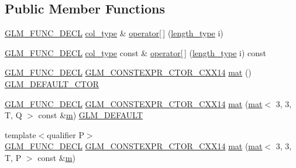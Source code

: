 \subsection*{Public Member Functions}
\begin{DoxyCompactItemize}
\item 
\mbox{\hyperlink{setup_8hpp_ab2d052de21a70539923e9bcbf6e83a51}{G\+L\+M\+\_\+\+F\+U\+N\+C\+\_\+\+D\+E\+CL}} \mbox{\hyperlink{structglm_1_1mat_3_013_00_013_00_01_t_00_01_q_01_4_a4d84bef3685131dbb0ac43cac0a3b147}{col\+\_\+type}} \& \mbox{\hyperlink{structglm_1_1mat_3_013_00_013_00_01_t_00_01_q_01_4_a2507891a0a3b6c233c4f8a58071a7d9e}{operator\mbox{[}$\,$\mbox{]}}} (\mbox{\hyperlink{structglm_1_1mat_3_013_00_013_00_01_t_00_01_q_01_4_ae1b8524f20936516a48384a2841b5b9d}{length\+\_\+type}} i)
\item 
\mbox{\hyperlink{setup_8hpp_ab2d052de21a70539923e9bcbf6e83a51}{G\+L\+M\+\_\+\+F\+U\+N\+C\+\_\+\+D\+E\+CL}} \mbox{\hyperlink{structglm_1_1mat_3_013_00_013_00_01_t_00_01_q_01_4_a4d84bef3685131dbb0ac43cac0a3b147}{col\+\_\+type}} const  \& \mbox{\hyperlink{structglm_1_1mat_3_013_00_013_00_01_t_00_01_q_01_4_abce9d671a13bf9f9a315b7f8b5042617}{operator\mbox{[}$\,$\mbox{]}}} (\mbox{\hyperlink{structglm_1_1mat_3_013_00_013_00_01_t_00_01_q_01_4_ae1b8524f20936516a48384a2841b5b9d}{length\+\_\+type}} i) const
\item 
\mbox{\hyperlink{setup_8hpp_ab2d052de21a70539923e9bcbf6e83a51}{G\+L\+M\+\_\+\+F\+U\+N\+C\+\_\+\+D\+E\+CL}} \mbox{\hyperlink{setup_8hpp_a0900f9145e68bf6061b6f5e7be3fa751}{G\+L\+M\+\_\+\+C\+O\+N\+S\+T\+E\+X\+P\+R\+\_\+\+C\+T\+O\+R\+\_\+\+C\+X\+X14}} \mbox{\hyperlink{structglm_1_1mat_3_013_00_013_00_01_t_00_01_q_01_4_ab10ee3449d1ee8d793fed6b94fe6270d}{mat}} () \mbox{\hyperlink{setup_8hpp_afb97a4e995bc004c0cbbfa22125b80ba}{G\+L\+M\+\_\+\+D\+E\+F\+A\+U\+L\+T\+\_\+\+C\+T\+OR}}
\item 
\mbox{\hyperlink{setup_8hpp_ab2d052de21a70539923e9bcbf6e83a51}{G\+L\+M\+\_\+\+F\+U\+N\+C\+\_\+\+D\+E\+CL}} \mbox{\hyperlink{setup_8hpp_a0900f9145e68bf6061b6f5e7be3fa751}{G\+L\+M\+\_\+\+C\+O\+N\+S\+T\+E\+X\+P\+R\+\_\+\+C\+T\+O\+R\+\_\+\+C\+X\+X14}} \mbox{\hyperlink{structglm_1_1mat_3_013_00_013_00_01_t_00_01_q_01_4_a15f1bac6c533d3d97a2caefbbe13f4c1}{mat}} (\mbox{\hyperlink{structglm_1_1mat}{mat}}$<$ 3, 3, T, Q $>$ const \&\mbox{\hyperlink{_s_d_l__opengl__glext_8h_af593500c283bf1a787a6f947f503a5c2}{m}}) \mbox{\hyperlink{setup_8hpp_aefce7051c376a64ba89fa93a9f63bc2c}{G\+L\+M\+\_\+\+D\+E\+F\+A\+U\+LT}}
\item 
{\footnotesize template$<$qualifier P$>$ }\\\mbox{\hyperlink{setup_8hpp_ab2d052de21a70539923e9bcbf6e83a51}{G\+L\+M\+\_\+\+F\+U\+N\+C\+\_\+\+D\+E\+CL}} \mbox{\hyperlink{setup_8hpp_a0900f9145e68bf6061b6f5e7be3fa751}{G\+L\+M\+\_\+\+C\+O\+N\+S\+T\+E\+X\+P\+R\+\_\+\+C\+T\+O\+R\+\_\+\+C\+X\+X14}} \mbox{\hyperlink{structglm_1_1mat_3_013_00_013_00_01_t_00_01_q_01_4_a03d7907b53e23d522516d4cc951d9b43}{mat}} (\mbox{\hyperlink{structglm_1_1mat}{mat}}$<$ 3, 3, T, P $>$ const \&\mbox{\hyperlink{_s_d_l__opengl__glext_8h_af593500c283bf1a787a6f947f503a5c2}{m}})

\end{DoxyCompactItemize}
